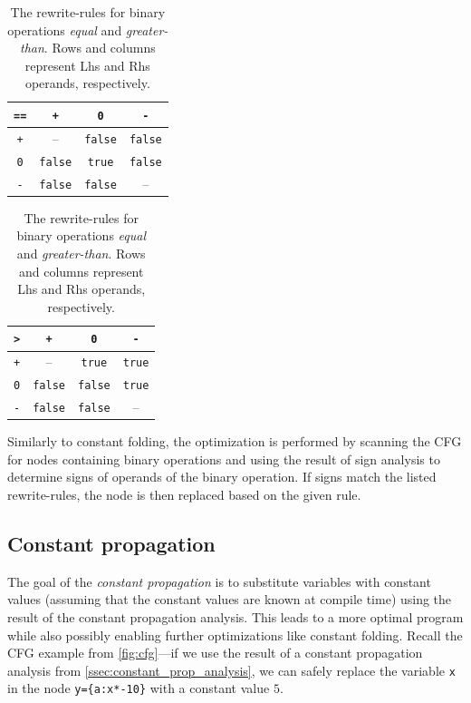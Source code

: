 \documentclass[thesis=M,english]{FITthesis}[2019/12/23]
\begin{document}
\begin{table}
\begin{minipage}{.5\linewidth}
    \centering
    \begin{tabular}{|c||c|c|c|}
    \hline
    \texttt{==} & \texttt{+} & \texttt{0} & \texttt{-}\\
    \hline
    \hline
    \texttt{+} & -- & \texttt{false} & \texttt{false}\\
    \hline
    \texttt{0} & \texttt{false} & \texttt{true} & \texttt{false}\\
    \hline
    \texttt{-} & \texttt{false} & \texttt{false} & --\\
    \hline
    \end{tabular}
\end{minipage}%
\begin{minipage}{.5\linewidth}
    \begin{tabular}{|c||c|c|c|}
    \hline
    \texttt{>} & \texttt{+} & \texttt{0} & \texttt{-}\\
    \hline
    \hline
    \texttt{+} & -- & \texttt{true} & \texttt{true}\\
    \hline
    \texttt{0} & \texttt{false} & \texttt{false} & \texttt{true}\\
    \hline
    \texttt{-} & \texttt{false} & \texttt{false} & --\\
    \hline
    \end{tabular}
\end{minipage}%
\caption[The rewrite-rules for binary operations \emph{equal} and \emph{greater-than}.]{The rewrite-rules for binary operations \emph{equal} and \emph{greater-than}. Rows and columns represent Lhs and Rhs operands, respectively.}\label{tab:rewrite_rules}
\end{table}

Similarly to constant folding, the optimization is performed by scanning the CFG for nodes containing binary operations and using the result of sign analysis to determine signs of operands of the binary operation. If signs match the listed rewrite-rules, the node is then replaced based on the given rule.

\subsection{Constant propagation}
The goal of the \emph{constant propagation} is to substitute variables with constant values (assuming that the constant values are known at compile time) using the result of the constant propagation analysis. This leads to a more optimal program while also possibly enabling further optimizations like constant folding. Recall the CFG example from \autoref{fig:cfg}---if we use the result of a constant propagation analysis from \autoref{ssec:constant_prop_analysis}, we can safely replace the variable \texttt{x} in the node \texttt{y=\{a:x*-10\}} with a constant value $5$.
\end{document}
